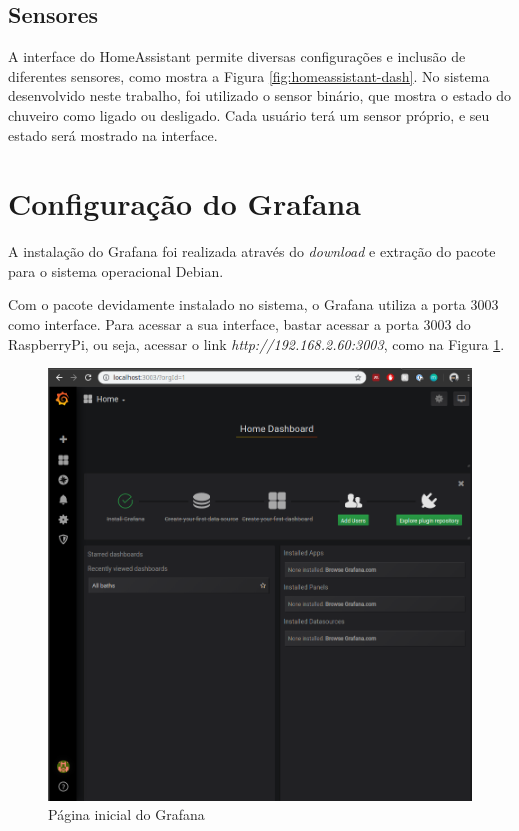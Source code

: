 \subsection{Sensores}

A interface do HomeAssistant permite diversas configurações e inclusão de diferentes sensores, como mostra a Figura \ref{fig:homeassistant-dash}. No sistema desenvolvido neste trabalho, foi utilizado o sensor binário, que mostra o estado do chuveiro como ligado ou desligado. Cada usuário terá um sensor próprio, e seu estado será mostrado na interface.


\section{Configuração do Grafana}

A instalação do Grafana foi realizada através do \textit{download} e extração do pacote para o sistema operacional Debian.

Com o pacote devidamente instalado no sistema, o Grafana utiliza a porta 3003 como interface. Para acessar a sua interface, bastar acessar a porta 3003 do RaspberryPi, ou seja, acessar o link \textit{http://192.168.2.60:3003}, como na Figura \ref{fig:grafanahome}.

\begin{figure}[htbp]
	\centering
	\includegraphics[width=1\linewidth]{figuras/grafanahome.png}
	\caption{Página inicial do Grafana}
	\label{fig:grafanahome}
\end{figure}

